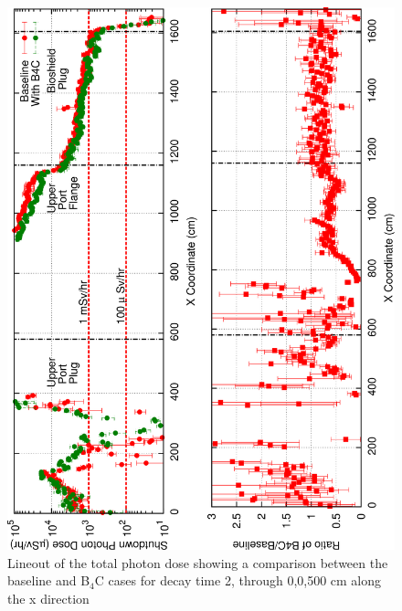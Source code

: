 \documentclass[12pt]{article}
\begin{document}
\begin{figure}[ht!]
\centering
\includegraphics[angle=-90,clip,scale=0.15]{../plots/photon_lineout/dc2_z500_lineout.png}
\caption{Lineout of the total photon dose showing a comparison between the baseline and B$_4$C cases for decay time 2,
                 through 0,0,500 cm along the x direction}
\label{fig:photons_dc2_total_dose_lineout_z500}
\end{figure}
\end{document}
